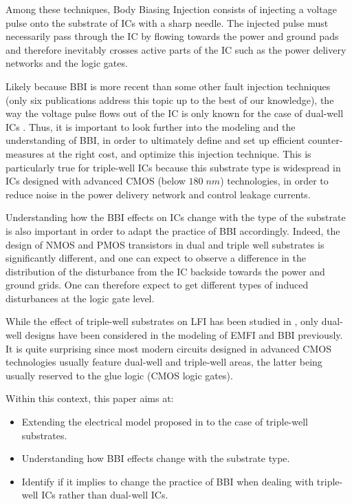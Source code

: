 \documentclass[10pt, conference, compsocconf]{IEEEtran}
\begin{document}
Among these techniques, Body Biasing Injection consists of injecting a voltage pulse onto the substrate of ICs with a sharp needle. The injected pulse must necessarily pass through the IC by flowing towards the power and ground pads and therefore inevitably crosses active parts of the IC such as the power delivery networks and the logic gates.

Likely because BBI is more recent than some other fault injection techniques (only six publications address this topic up to the best of our knowledge), the way the voltage pulse flows out of the IC is only known for the case of dual-well ICs \cite{mybbi}. Thus, it is important to look further into the modeling and the understanding of BBI, in order to ultimately define and set up efficient counter-measures at the right cost, and optimize this injection technique. This is particularly true for triple-well ICs because this substrate type is widespread in ICs designed with advanced CMOS (below $180 \; nm$) technologies, in order to reduce noise in the power delivery network and control leakage currents.

Understanding how the BBI effects on ICs change with the type of the substrate is also important in order to adapt the practice of BBI accordingly. Indeed, the design of NMOS and PMOS transistors in dual and triple well substrates is significantly different, and one can expect to observe a difference in the distribution of the disturbance from the IC backside towards the power and ground grids. One can therefore expect to get different types of induced disturbances at the logic gate level.

While the effect of triple-well substrates on LFI has been studied in \cite{lfitriplewell}, only dual-well designs have been considered in the modeling of EMFI \cite{mathieuEMFI} and BBI \cite{mybbi} previously. It is quite surprising since most modern circuits designed in advanced CMOS technologies usually feature dual-well and triple-well areas, the latter being usually reserved to the glue logic (CMOS logic gates).

Within this context, this paper aims at:
\begin{itemize}
    \item Extending the electrical model proposed in \cite{mybbi} to the case of triple-well substrates.
    \item Understanding how BBI effects change with the substrate type.
    \item Identify if it implies to change the practice of BBI when dealing with triple-well ICs rather than dual-well ICs.
\end{itemize}
\end{document}
